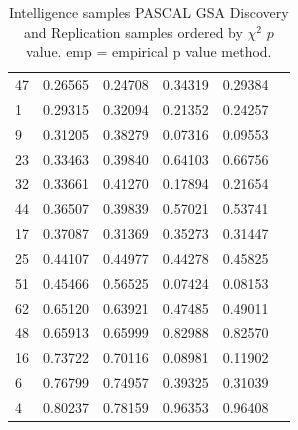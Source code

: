 \begin{table}[ht]
\begin{tabular}{llllll}
  47 & 0.26565 & 0.24708 & 0.34319 & 0.29384 \\ 
  1 & 0.29315 & 0.32094 & 0.21352 & 0.24257 \\ 
  9 & 0.31205 & 0.38279 & 0.07316 & 0.09553 \\ 
  23 & 0.33463 & 0.39840 & 0.64103 & 0.66756 \\ 
  32 & 0.33661 & 0.41270 & 0.17894 & 0.21654 \\ 
  44 & 0.36507 & 0.39839 & 0.57021 & 0.53741 \\ 
  17 & 0.37087 & 0.31369 & 0.35273 & 0.31447 \\ 
  25 & 0.44107 & 0.44977 & 0.44278 & 0.45825 \\ 
  51 & 0.45466 & 0.56525 & 0.07424 & 0.08153 \\ 
  62 & 0.65120 & 0.63921 & 0.47485 & 0.49011 \\ 
  48 & 0.65913 & 0.65999 & 0.82988 & 0.82570 \\ 
  16 & 0.73722 & 0.70116 & 0.08981 & 0.11902 \\ 
  6 & 0.76799 & 0.74957 & 0.39325 & 0.31039 \\ 
  4 & 0.80237 & 0.78159 & 0.96353 & 0.96408 \\ 
   \bottomrule
\end{tabular}
\caption[GSA PASCAL Intelligence]{Intelligence samples PASCAL GSA Discovery and Replication samples ordered by $\chi^2$ $p$ value. emp = empirical p value method.}
\label{tab:Intelligence PASCAL}
\end{table}


